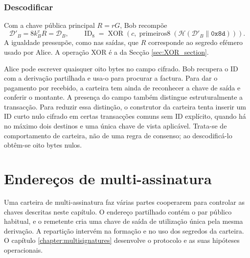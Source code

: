 \subsubsection*{Descodificar}

Com a chave pública principal \(R=rG\), Bob recompõe
\[
 \mathcal D'_B=8k_B^vR=\mathcal D_B,\qquad
 \operatorname{ID}_{8}=\operatorname{XOR}\!\left(
 c,\operatorname{primeiros8}\!\left(
   \mathcal H(\mathcal D'_B\mathbin\|\texttt{0x8d})\right)\right).
\]
A igualdade pressupõe, como nas saídas, que \(R\) corresponde ao segredo
efémero usado por Alice. A operação XOR é a da Secção
\ref{sec:XOR_section}.

Alice pode escrever quaisquer oito bytes no campo cifrado. Bob recupera
o ID com a derivação partilhada e usa-o para procurar a factura. Para dar
o pagamento por recebido, a carteira tem ainda de reconhecer a chave de
saída e conferir o montante. A presença do
campo também distingue estruturalmente a transacção. Para reduzir essa
distinção, o construtor da carteira tenta inserir um ID curto nulo cifrado em
certas transacções comuns sem ID explícito, quando há no máximo dois destinos
e uma única chave de vista aplicável. Trata-se de comportamento de carteira,
não de uma regra de consenso; ao descodificá-lo obtêm-se oito bytes nulos.

\section{Endereços de multi-assinatura}
\label{sec:multisignature-addresses}

Uma carteira de multi-assinatura faz várias partes cooperarem para controlar
as chaves descritas neste capítulo. O endereço partilhado contém o par
público habitual, e o remetente cria uma chave de saída de utilização única
pela mesma derivação. A repartição intervém na formação e no uso dos segredos
da carteira. O capítulo \ref{chapter:multisignatures} desenvolve o protocolo
e as suas hipóteses operacionais.
